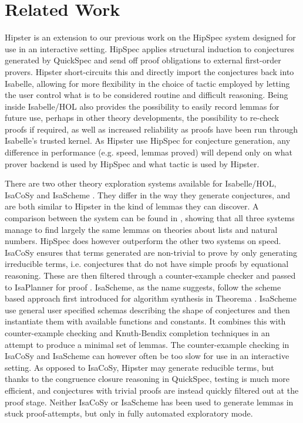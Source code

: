 \section{Related Work}
\label{sec:related}


Hipster is an extension to our previous work on the HipSpec system \cite{hipspecCADE} designed for use in an interactive setting. HipSpec applies structural induction to conjectures generated by QuickSpec and send off proof obligations to external first-order provers. Hipster short-circuits this and directly import the conjectures back into Isabelle, allowing for more flexibility in the choice of tactic employed by letting the user control what is to be considered routine and difficult reasoning. Being inside Isabelle/HOL also provides the possibility to easily record lemmas for future use, perhaps in other theory developments,  the possibility to re-check proofs if required, as well as increased reliability as proofs have been run through Isabelle's trusted kernel. As Hipster use HipSpec for conjecture generation, any difference in performance (e.g. speed, lemmas proved) will depend only on what prover backend is used by HipSpec and what tactic is used by Hipster. %

There are two other theory exploration systems available for Isabelle/HOL, IsaCoSy \cite{isacosy} and IsaScheme \cite{isascheme}. They differ in the way they generate conjectures, and are both similar to Hipster in the kind of lemmas they can discover. A comparison between the system can be found in \cite{hipspecCADE}, showing that all three systems manage to find largely the same lemmas on theories about lists and natural numbers. HipSpec does however outperform the other two systems on speed.
IsaCoSy ensures that terms generated are non-trivial to prove by only generating irreducible terms, i.e. conjectures that do not have simple proofs by equational reasoning. These are then filtered through a counter-example checker and passed to IsaPlanner for proof \cite{isaplanner}. IsaScheme, as the name suggests, follow the scheme based approach first introduced for algorithm synthesis in Theorema \cite{theorema}. IsaScheme use general user specified schemas describing the shape of conjectures and then instantiate them with available functions and constants. It combines this with counter-example checking and Knuth-Bendix completion techniques in an attempt to produce a minimal set of lemmas. 
The counter-example checking in IsaCoSy and IsaScheme can however often be too slow for use in an interactive setting. As opposed to IsaCoSy, Hipster may generate reducible terms, but thanks to the congruence closure reasoning in QuickSpec, testing is much more efficient, and conjectures with trivial proofs are instead quickly filtered out at the proof stage. 
Neither IsaCoSy or IsaScheme has been used to generate lemmas in stuck proof-attempts, but only in fully automated exploratory mode. 

